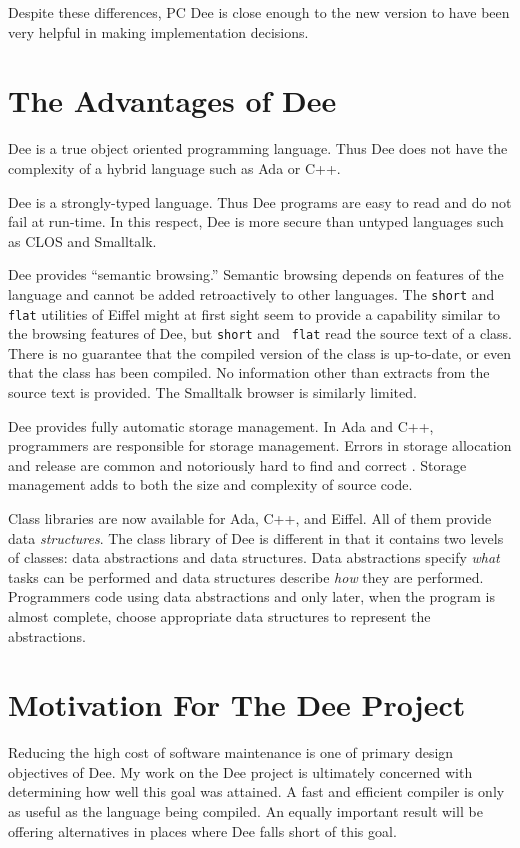 Despite these differences, PC Dee is close enough to the new version
to have been very helpful in making implementation decisions.

\section{The Advantages of Dee}

Dee is a true object oriented programming language. Thus Dee does not have the
complexity of a hybrid language such as Ada or C++.

Dee is a strongly-typed language. Thus Dee programs are easy to read and
do not fail at run-time. In this respect, Dee is more secure than untyped
languages such as CLOS and Smalltalk.

Dee provides ``semantic browsing.'' Semantic browsing depends on
features of the language and cannot be added retroactively to other
languages. The {\tt short} and {\tt flat} utilities of Eiffel
\cite{Meyer88} might at first sight seem to provide a capability
similar to the browsing features of Dee, but {\tt short} and {\tt
flat} read the source text of a class.  There is no guarantee that the
compiled version of the class is up-to-date, or even that the class
has been compiled. No information other than extracts from the source
text is provided. The Smalltalk browser is similarly limited.

Dee provides fully automatic storage management. In Ada and C++,
programmers are responsible for storage management. Errors in storage
allocation and release are common and notoriously hard to find and correct
\cite{Sakkinen88}. Storage management adds to both the size and complexity of
source code.

Class libraries are now available for Ada, C++, and Eiffel. All of them
provide data {\em structures\/}. The class library of Dee is different in
that it contains two levels of classes: data abstractions and data
structures. Data abstractions specify {\em what\/} tasks can be performed
and data structures describe {\em how\/} they are performed. Programmers
code using data abstractions and only later, when the program is almost
complete, choose appropriate data structures to represent the abstractions.


\section{Motivation For The Dee Project}

Reducing the high cost of software maintenance is one of primary
design objectives of Dee.  My work on the Dee project is ultimately
concerned with determining how well this goal was attained.  A fast
and efficient compiler is only as useful as the language being
compiled. An equally important result will be offering alternatives in
places where Dee falls short of this goal.

